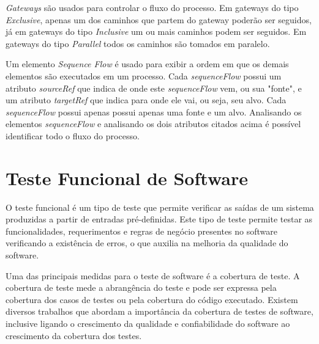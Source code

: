 \documentclass[12pt]{article}
\begin{document}
\emph{Gateways} são usados para controlar o fluxo do processo. Em gateways do tipo \emph{Exclusive}, apenas um dos caminhos que partem do gateway poderão ser seguidos, já em gateways do tipo \emph{Inclusive} um ou mais caminhos podem ser seguidos. Em gateways do tipo \emph{Parallel} todos os caminhos são tomados em paralelo.


Um elemento \emph{Sequence Flow} é usado para exibir a ordem em que os demais elementos são executados em um processo. Cada \emph{sequenceFlow} possui um atributo \emph{sourceRef} que indica de onde este \emph{sequenceFlow} vem, ou sua "fonte", e um atributo \emph{targetRef} que indica para onde ele vai, ou seja, seu alvo. Cada \emph{sequenceFlow} possui apenas possui apenas uma fonte e um alvo. Analisando os elementos \emph{sequenceFlow} e analisando os dois atributos citados acima é possível identificar todo o fluxo do processo.


\section{Teste Funcional de Software}
O teste funcional é um tipo de teste que permite verificar as saídas de um sistema produzidas a partir de entradas pré-definidas. Este tipo de teste permite testar as funcionalidades, requerimentos e regras de negócio presentes no software\cite{molinari2003testes} verificando a existência de erros, o que auxilia na melhoria da qualidade do software.

Uma das principais medidas para o teste de software é a cobertura de teste. A cobertura de teste mede a abrangência do teste e pode ser expressa pela cobertura dos casos de testes ou pela cobertura do código executado. Existem diversos trabalhos que abordam a importância da cobertura de testes de software\cite{zhu1997software,bieman1996using}, inclusive ligando o crescimento da qualidade e confiabilidade do software ao crescimento da cobertura dos testes\cite{malaiya2002software}.

\end{document}
